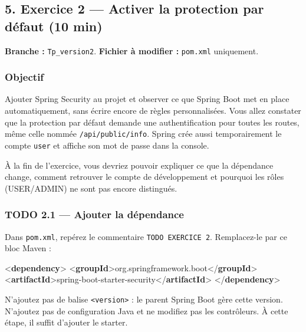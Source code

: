 \documentclass[
  french,
  10pt,
  a4paper,
]{article}
\newenvironment{Shaded}{}{}
\newcommand{\KeywordTok}[1]{\textcolor[rgb]{0.00,0.44,0.13}{\textbf{#1}}}
\newcommand{\NormalTok}[1]{#1}
\begin{document}
\subsection{5. Exercice 2 --- Activer la protection par défaut (10
min)}\label{exercice-2-activer-la-protection-par-duxe9faut-10-min}

\textbf{Branche :} \texttt{Tp\_version2}. \textbf{Fichier à modifier :}
\texttt{pom.xml} uniquement.

\subsubsection{Objectif}\label{objectif}

Ajouter Spring Security au projet et observer ce que Spring Boot met en
place automatiquement, sans écrire encore de règles personnalisées. Vous
allez constater que la protection par défaut demande une
authentification pour toutes les routes, même celle nommée
\texttt{/api/public/info}. Spring crée aussi temporairement le compte
\texttt{user} et affiche son mot de passe dans la console.

À la fin de l'exercice, vous devriez pouvoir expliquer ce que la
dépendance change, comment retrouver le compte de développement et
pourquoi les rôles (USER/ADMIN) ne sont pas encore distingués.

\subsubsection{TODO 2.1 --- Ajouter la
dépendance}\label{todo-2.1-ajouter-la-duxe9pendance}

Dans \texttt{pom.xml}, repérez le commentaire
\texttt{TODO\ EXERCICE\ 2}. Remplacez-le par ce bloc Maven :

\begin{Shaded}
\begin{Highlighting}[]
\NormalTok{\textless{}}\KeywordTok{dependency}\NormalTok{\textgreater{}}
\NormalTok{    \textless{}}\KeywordTok{groupId}\NormalTok{\textgreater{}org.springframework.boot\textless{}/}\KeywordTok{groupId}\NormalTok{\textgreater{}}
\NormalTok{    \textless{}}\KeywordTok{artifactId}\NormalTok{\textgreater{}spring{-}boot{-}starter{-}security\textless{}/}\KeywordTok{artifactId}\NormalTok{\textgreater{}}
\NormalTok{\textless{}/}\KeywordTok{dependency}\NormalTok{\textgreater{}}
\end{Highlighting}
\end{Shaded}

N'ajoutez pas de balise \texttt{\textless{}version\textgreater{}} : le
parent Spring Boot gère cette version. N'ajoutez pas de configuration
Java et ne modifiez pas les contrôleurs. À cette étape, il suffit
d'ajouter le starter.
\end{document}
